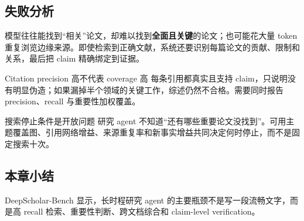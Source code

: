 \subsection{失败分析}


模型往往能找到“相关”论文，却难以找到\textbf{全面且关键}的论文；也可能花大量 token 重复浏览边缘来源。即使检索到正确文献，系统还要识别每篇论文的贡献、限制和关系，最后把 claim 精确绑定到证据。

\begin{warningbox}{Citation precision 高不代表 coverage 高}
每条引用都真实且支持 claim，只说明没有明显伪造；如果漏掉半个领域的关键工作，综述仍然不合格。需要同时报告 precision、recall 与重要性加权覆盖。
\end{warningbox}

\begin{knowledgebox}{搜索停止条件是开放问题}
研究 agent 不知道“还有哪些重要论文没找到”。可用主题覆盖图、引用网络增益、来源重复率和新事实增益共同决定何时停止，而不是固定搜索十次。
\end{knowledgebox}

\subsection{本章小结}

DeepScholar-Bench 显示，长时程研究 agent 的主要瓶颈不是写一段流畅文字，而是高 recall 检索、重要性判断、跨文档综合和 claim-level verification。

